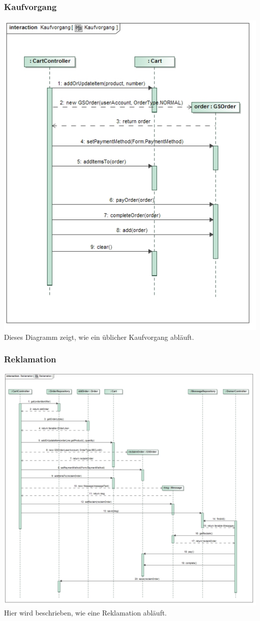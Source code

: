 \documentclass[pdftex,12pt,a4paper]{article}
\begin{document}
\subsubsection*{Kaufvorgang}
\includegraphics[width=1\textwidth]{../../Entwurf/kaufvorgang_ood}
Dieses Diagramm zeigt, wie ein \"ublicher Kaufvorgang abl\"auft.
\subsubsection*{Reklamation}
\includegraphics[width=1\textwidth]{../../Entwurf/reklamation_ood}
Hier wird beschrieben, wie eine Reklamation abl\"auft.
\end{document}
